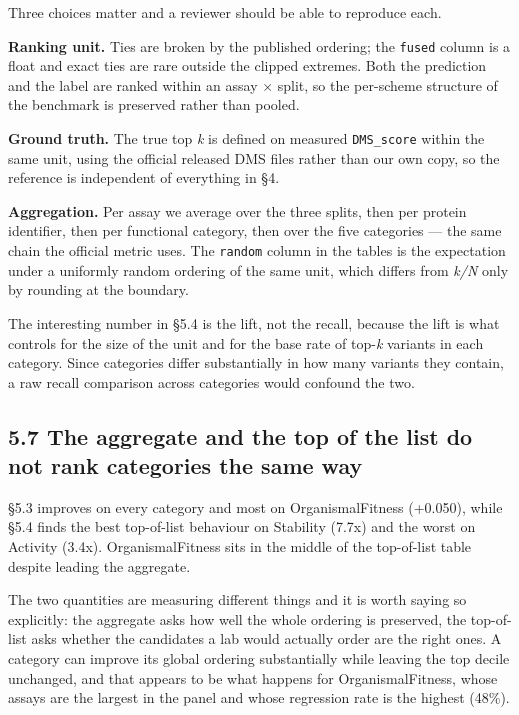 Three choices matter and a reviewer should be able to reproduce each.

\textbf{Ranking unit.} Ties are broken by the published ordering; the \texttt{fused} column is a float and exact
ties are rare outside the clipped extremes. Both the prediction and the label are ranked within an
assay × split, so the per-scheme structure of the benchmark is preserved rather than pooled.

\textbf{Ground truth.} The true top \emph{k} is defined on measured \texttt{DMS\_score} within the same unit, using the
official released DMS files rather than our own copy, so the reference is independent of everything in
§4.

\textbf{Aggregation.} Per assay we average over the three splits, then per protein identifier, then per
functional category, then over the five categories --- the same chain the official metric uses. The
\texttt{random} column in the tables is the expectation under a uniformly random ordering of the same unit,
which differs from \emph{k/N} only by rounding at the boundary.

The interesting number in §5.4 is the lift, not the recall, because the lift is what controls for the
size of the unit and for the base rate of top-\emph{k} variants in each category. Since categories differ
substantially in how many variants they contain, a raw recall comparison across categories would
confound the two.

\hypertarget{the-aggregate-and-the-top-of-the-list-do-not-rank-categories-the-same-way}{%
\subsection{5.7 The aggregate and the top of the list do not rank categories the same way}\label{the-aggregate-and-the-top-of-the-list-do-not-rank-categories-the-same-way}}

§5.3 improves on every category and most on OrganismalFitness (+0.050), while §5.4 finds the best
top-of-list behaviour on Stability (7.7x) and the worst on Activity (3.4x). OrganismalFitness sits in
the middle of the top-of-list table despite leading the aggregate.

The two quantities are measuring different things and it is worth saying so explicitly: the aggregate
asks how well the whole ordering is preserved, the top-of-list asks whether the candidates a lab would
actually order are the right ones. A category can improve its global ordering substantially while
leaving the top decile unchanged, and that appears to be what happens for OrganismalFitness, whose
assays are the largest in the panel and whose regression rate is the highest (48\%).

